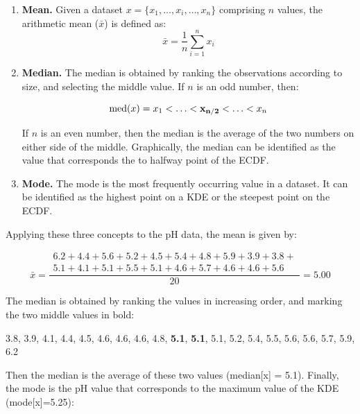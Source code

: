 \begin{enumerate}
\item{\bf Mean.} Given a dataset $x = \{x_1,\ldots ,x_i,\ldots, x_n\}$
  comprising $n$ values, the arithmetic mean ($\bar{x}$) is defined
  as:
  \begin{equation}
    \bar{x} = \frac{1}{n}\sum\limits_{i=1}^{n}x_i
    \label{eq:mean}
  \end{equation}
\item{\bf Median.} The median is obtained by ranking the observations
  according to size, and selecting the middle value. If $n$ is an odd
  number, then:

  \begin{equation}
    \mbox{med}(x) = x_1 < \ldots < {\bf x_{n/2}} < \ldots < x_n
  \end{equation}

  If $n$ is an even number, then the median is the average of the two
  numbers on either side of the middle. Graphically, the median can be
  identified as the value that corresponds the to halfway point of the
  ECDF.
  
\item{\bf Mode.} The mode is the most frequently occurring value in a
  dataset. It can be identified as the highest point on a KDE or the
  steepest point on the ECDF.
\end{enumerate}

Applying these three concepts to the pH data, the mean is given by:

\begin{equation*}
  \bar{x} = \frac{
    \begin{array}{c}
      6.2+4.4+5.6+5.2+4.5+5.4+4.8+5.9+3.9+3.8+ \\
      5.1+4.1+5.1+5.5+5.1+4.6+5.7+4.6+4.6+5.6
    \end{array}
  }{20} = 5.00
\end{equation*}

The median is obtained by ranking the values in increasing order, and
marking the two middle values in bold:

\begin{center}
  {3.8, 3.9, 4.1, 4.4, 4.5, 4.6, 4.6, 4.6, 4.8, \textbf{5.1},
  \textbf{5.1}, 5.1, 5.2, 5.4, 5.5, 5.6, 5.6, 5.7, 5.9, 6.2}
\end{center}

Then the median is the average of these two values (median[x] =
5.1). Finally, the mode is the pH value that corresponds to the
maximum value of the KDE (mode[x]=5.25):

